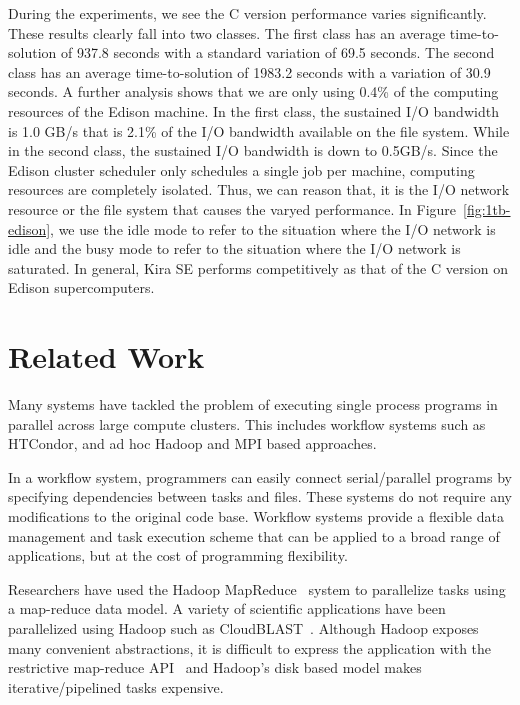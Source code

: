 \documentclass[conference]{IEEEtran}
\begin{document}
During the experiments, we see the C version performance varies significantly. These results
clearly fall into two classes. The first class has an average time-to-solution of 937.8 seconds
with a standard variation of 69.5 seconds. The second class has an average time-to-solution 
of 1983.2 seconds with a variation of 30.9 seconds. A further analysis shows that we are only 
using 0.4\% of the computing resources of the Edison machine. In the first class, the sustained
I/O bandwidth is 1.0 GB/s that is 2.1\% of the I/O bandwidth available on the file system.
While in the second class, the sustained I/O bandwidth is down to 0.5GB/s.
Since the Edison cluster scheduler only schedules a single job per machine, computing resources 
are completely isolated. Thus, we can reason that, it is the I/O network resource or the file system 
that causes the varyed performance. In Figure~\ref{fig:1tb-edison}, we use the idle mode to refer to the 
situation where the I/O network is idle and the busy mode to refer to the situation where the
I/O network is saturated. In general, Kira SE performs competitively as that of the C version
on Edison supercomputers. 


\section{Related Work}
\label{sec:Related}

Many systems have tackled the problem of executing single process programs in parallel
across large compute clusters. This includes workflow systems such as HTCondor,
and ad hoc Hadoop and MPI based approaches.

In a workflow system, programmers can easily connect serial/parallel programs by specifying
dependencies between tasks and files. These systems do not require any modifications to
the original code base. Workflow systems provide a flexible data management and task execution
scheme that can be applied to a broad range of applications, but at the cost of programming
flexibility.

Researchers have used the Hadoop MapReduce~\cite{HADOOP} system to parallelize
tasks using a map-reduce data model. A variety of scientific applications have been parallelized
using Hadoop such as CloudBLAST~\cite{matsunaga08}. 
Although Hadoop exposes many convenient abstractions, it is difficult to express the application 
with the restrictive map-reduce API~\cite{dewitt08} and Hadoop's disk based model makes 
iterative/pipelined tasks expensive.
\end{document}
